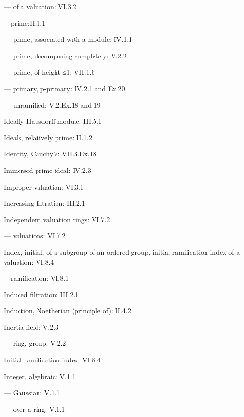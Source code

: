 --- of a valuation: VI.3.2

---prime:II.1.1

--- prime, associated with a module: IV.1.1

--- prime, decomposing completely: V.2.2

--- prime, of height ≤1: VII.1.6

--- primary, p-primary: IV.2.1 and Ex.20

--- unramified: V.2.Ex.18 and 19

Ideally Hausdorff module: III.5.1

Ideals, relatively prime: II.1.2

Identity, Cauchy's: VII.3.Ex.18

Immersed prime ideal: IV.2.3

Improper valuation: VI.3.1

Increasing filtration: III.2.1

Independent valuation rings: VI.7.2

--- valuations: VI.7.2

Index, initial, of a subgroup of an ordered group, initial ramification index of a valuation: VI.8.4

---ramification: VI.8.1

Induced filtration: III.2.1

Induction, Noetherian (principle of): II.4.2

Inertia field: V.2.3

--- ring, group: V.2.2

Initial ramification index: VI.8.4

Integer, algebraic: V.1.1

--- Gaussian: V.1.1

--- over a ring: V.1.1

